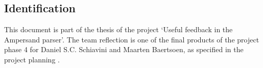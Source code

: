 
\subsection{Identification}
This document is part of the thesis of the project `Useful feedback in the Ampersand parser'.
The team reflection is one of the final products of the project phase 4 for Daniel S.C. Schiavini and Maarten Baertsoen, as specified in the project planning .
